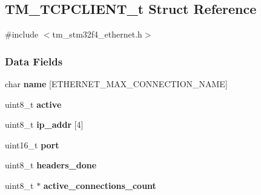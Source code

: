 \hypertarget{struct_t_m___t_c_p_c_l_i_e_n_t__t}{}\subsection{T\+M\+\_\+\+T\+C\+P\+C\+L\+I\+E\+N\+T\+\_\+t Struct Reference}
\label{struct_t_m___t_c_p_c_l_i_e_n_t__t}


{\ttfamily \#include $<$tm\+\_\+stm32f4\+\_\+ethernet.\+h$>$}

\subsubsection*{Data Fields}
\begin{DoxyCompactItemize}
\item 
\hypertarget{struct_t_m___t_c_p_c_l_i_e_n_t__t_a7849befe648605976cbad9850f4afb52}{}char {\bfseries name} \mbox{[}E\+T\+H\+E\+R\+N\+E\+T\+\_\+\+M\+A\+X\+\_\+\+C\+O\+N\+N\+E\+C\+T\+I\+O\+N\+\_\+\+N\+A\+M\+E\mbox{]}\label{struct_t_m___t_c_p_c_l_i_e_n_t__t_a7849befe648605976cbad9850f4afb52}

\item 
\hypertarget{struct_t_m___t_c_p_c_l_i_e_n_t__t_a05c940dbc220f5a723afd70071aebff8}{}uint8\+\_\+t {\bfseries active}\label{struct_t_m___t_c_p_c_l_i_e_n_t__t_a05c940dbc220f5a723afd70071aebff8}

\item 
\hypertarget{struct_t_m___t_c_p_c_l_i_e_n_t__t_a43d041f66a68d7de2411f35f23ee2d97}{}uint8\+\_\+t {\bfseries ip\+\_\+addr} \mbox{[}4\mbox{]}\label{struct_t_m___t_c_p_c_l_i_e_n_t__t_a43d041f66a68d7de2411f35f23ee2d97}

\item 
\hypertarget{struct_t_m___t_c_p_c_l_i_e_n_t__t_a8e0798404bf2cf5dabb84c5ba9a4f236}{}uint16\+\_\+t {\bfseries port}\label{struct_t_m___t_c_p_c_l_i_e_n_t__t_a8e0798404bf2cf5dabb84c5ba9a4f236}

\item 
\hypertarget{struct_t_m___t_c_p_c_l_i_e_n_t__t_ab66a7c6d7a262ea60c9919e3d08654d3}{}uint8\+\_\+t {\bfseries headers\+\_\+done}\label{struct_t_m___t_c_p_c_l_i_e_n_t__t_ab66a7c6d7a262ea60c9919e3d08654d3}

\item 
\hypertarget{struct_t_m___t_c_p_c_l_i_e_n_t__t_ae648ebdf3ea1f285a7dfe429707bce0e}{}uint8\+\_\+t $\ast$ {\bfseries active\+\_\+connections\+\_\+count}\label{struct_t_m___t_c_p_c_l_i_e_n_t__t_ae648ebdf3ea1f285a7dfe429707bce0e}


\end{DoxyCompactItemize}
